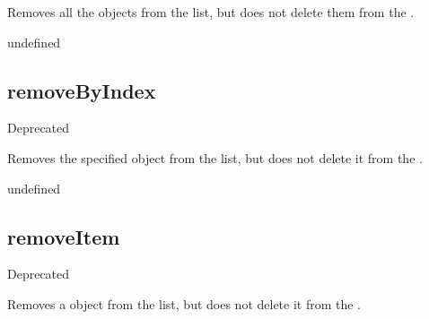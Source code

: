 \documentclass[letterpaper,12pt,english,openany,oneside]{sphinxmanual}
\begin{document}
Removes all the  objects from the list, but does not delete them from the .

\label{\detokenize{JS_3D_API:syntax-112}}

\begin{sphinxVerbatim}[commandchars=\\\{\}]
\end{sphinxVerbatim}
\label{\detokenize{JS_3D_API:returns-113}}

undefined


\subsection{removeByIndex}
\label{\detokenize{JS_3D_API:removebyindex}}
Deprecated

Removes the specified  object from the list, but does not delete it from the .

\label{\detokenize{JS_3D_API:syntax-113}}

\begin{sphinxVerbatim}[commandchars=\\\{\}]
\end{sphinxVerbatim}
\label{\detokenize{JS_3D_API:parameters-82}}

\label{\detokenize{JS_3D_API:section-113}}\label{\detokenize{JS_3D_API:returns-114}}

undefined


\subsection{removeItem}
\label{\detokenize{JS_3D_API:removeitem}}
Deprecated

Removes a  object from the list, but does not delete it from the .

\label{\detokenize{JS_3D_API:syntax-114}}

\begin{sphinxVerbatim}[commandchars=\\\{\}]
\end{sphinxVerbatim}
\label{\detokenize{JS_3D_API:parameters-83}}
\end{document}
